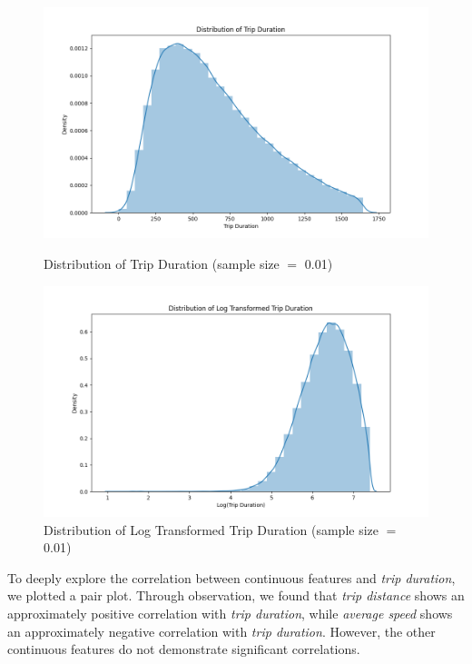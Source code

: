 \documentclass[11pt]{article}
\begin{document}
\begin{figure}[h!]
  \centering
  \begin{minipage}[b]{0.45\textwidth}
    \includegraphics[width=\textwidth]{distribution_of_trip_duration.png}
    \caption{Distribution of Trip Duration (sample size $=$ 0.01)}
    \label{fig:image1}
  \end{minipage}
  \hfill
  \begin{minipage}[b]{0.45\textwidth}
    \includegraphics[width=\textwidth]{distribution_of_log_transformed_trip_duration.png}
    \caption{Distribution of Log Transformed Trip Duration (sample size $=$ 0.01)}
    \label{fig:image2}
  \end{minipage}
\end{figure}

To deeply explore the correlation between continuous features and \textit{trip duration}, we plotted a pair plot. Through observation, we found that \textit{trip distance} shows an approximately positive correlation with \textit{trip duration}, while \textit{average speed} shows an approximately negative correlation with \textit{trip duration}. However, the other continuous features do not demonstrate significant correlations.
\end{document}
